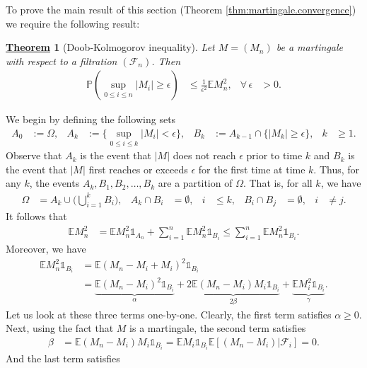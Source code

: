 \documentclass[12pt]{book}
\let\varepsilon\epsilon
\numberwithin{equation}{chapter}
\theoremstyle{plain}
\newtheorem{theorem}{\underline{Theorem}}
\numberwithin{theorem}{section}
\theoremstyle{definition}
\numberwithin{exercise}{chapter}
\let\oldendproof\endproof
\renewenvironment{proof}[1][\proofname]{%
  \oldproof[\scshape\underline{#1}]%
}{\oldendproof}
\newcommand{\<}{\langle}
\renewcommand{\>}{\rangle}
\renewcommand{\(}{\left(}
\renewcommand{\)}{\right)}
\renewcommand{\[}{\left[}
\renewcommand{\]}{\right]}
\newcommand\Eb{\mathds{E}}
\newcommand\Ib{\mathds{1}} 	%
\newcommand\Pb{\mathds{P}}
\newcommand\Fc{\mathscr{F}}
\newcommand\eps{\varepsilon}
\newcommand\Om{\Omega}
\newcommand\gam{\gamma}
\begin{document}
\noindent
To prove the main result of this section (Theorem \ref{thm:martingale.convergence}) we require the following result:

\begin{theorem}[Doob-Kolmogorov inequality]
\label{thm:doob-kolmogorov}
Let $M = (M_n)$ be a martingale with respect to a filtration $(\Fc_n)$.  Then
\begin{align}
\Pb( \sup_{0 \leq i \leq n} |M_i| \geq \eps )
	&\leq	\tfrac{1}{\eps^2} \Eb M_n^2 , &
\forall \, \eps
	&>	0 . \label{ineq:doob-kolmogorov}
\end{align}
\end{theorem} 

\begin{proof}
We begin by defining the following sets
\begin{align}
A_0
	&:=	\Om , &
A_k
	&:=	\{ \sup_{0 \leq i \leq k} |M_i| < \eps \} , &
B_k
	&:=	A_{k-1} \cap \{ |M_k| \geq \eps \} , &
k
	&\geq 1 .
\end{align}
Observe that 
$A_k$ is the event that $|M|$ does not reach $\eps$ prior to time $k$ and
$B_k$ is the event that $|M|$ first reaches or exceeds $\eps$ for the first time at time $k$.  Thus, for any $k$, the events $A_k, B_1, B_2, \ldots, B_k$ are a partition of $\Om$.  That is, for all $k$, we have
\begin{align}
\Om
	&=	A_k \cup \Big( \bigcup_{i=1}^k B_i \Big) , &
A_k \cap B_i
	&=	\emptyset , &
i 
	&\leq k , &
B_i \cap B_j
	&=	\emptyset , &
i
	&\neq j .
\end{align}
It follows that
\begin{align}
\Eb M_n^2
	&=	\Eb M_n^2 \Ib_{A_n} + \sum_{i=1}^n \Eb M_n^2 \Ib_{B_i} 
	\leq \sum_{i=1}^n \Eb M_n^2 \Ib_{B_i} .
\end{align}
Moreover, we have
\begin{align}
\Eb M_n^2 \Ib_{B_i}
	&=	\Eb (M_n - M_i + M_i)^2 \Ib_{B_i} \\
	&=	\underbrace{ \Eb (M_n - M_i)^2 \Ib_{B_i} }_{\alpha}
			+ \underbrace{ 2 \Eb (M_n - M_i) M_i \Ib_{B_i} }_{2 \beta}
			+ \underbrace{ \Eb M_i^2 \Ib_{B_i} }_{\gam} .
\end{align}
Let us look at these three terms one-by-one.
Clearly, the first term satisfies $\alpha \geq 0$.  Next, using the fact that $M$ is a martingale, the second term satisfies
\begin{align}
\beta
	&=	\Eb (M_n - M_i) M_i \Ib_{B_i} 
	=		\Eb M_i \Ib_{B_i} \Eb[ (M_n - M_i) | \Fc_i ]
	=		0 .
\end{align}
And the last term satisfies

\end{proof}
\end{document}
